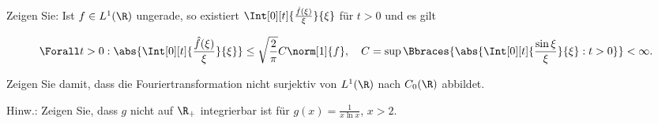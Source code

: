 
\begin{exercise}

Zeigen Sie:
Ist $f \in L^1(\R)$ ungerade, so existiert $\Int[0][t]{\frac{\hat f(\xi)}{\xi}}{\xi}$ für $t > 0$ und es gilt

\begin{align*}
    \Forall t > 0:
    \abs
    {
        \Int[0][t]
        {
            \frac{\hat f(\xi)}{\xi}
        }{\xi}
    }
    \leq
    \sqrt \frac{2}{\pi}
    C
    \norm[1]{f},
    \quad
    C
    =
    \sup
    \Bbraces
    {
        \abs
        {
            \Int[0][t]
            {
                \frac{\sin \xi}{\xi}
            }{\xi}:
            t > 0
        }
    }
    <
    \infty.
\end{align*}

Zeigen Sie damit, dass die Fouriertransformation nicht surjektiv von $L^1(\R)$ nach $C_0(\R)$ abbildet.

Hinw.:
Zeigen Sie, dass $g$ nicht auf $\R_+$ integrierbar ist für $g(x) = \frac{1}{x \ln x}$, $x > 2$.

\end{exercise}


